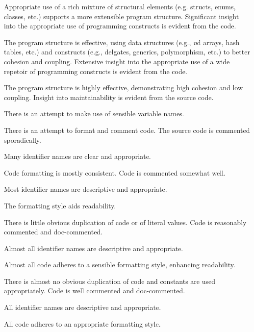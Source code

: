 \documentclass{../../fal_assignment}
\begin{document}
\begin{markingrubric}
            \par Appropriate use of a rich mixture of structural elements (e.g. structs, enums, classes, etc.) supports a more extensible program structure.
        \grade Significant insight into the appropriate use of programming constructs is evident from the code.
            \par The program structure is effective, using data structures (e.g., \textit{n}d arrays, hash tables, etc.) and constructs (e.g., delgates, generics, polymorphism, etc.) to better cohesion and coupling.
        \grade Extensive insight into the appropriate use of a wide repetoir of programming constructs is evident from the code.
            \par The program structure is highly effective, demonstrating high cohesion and low coupling.
%
        \grade\fail Insight into maintainability is evident from the source code.
            \par There is an attempt to make use of sensible variable names.
            \par There is an attempt to format and comment code.
        \grade The source code is commented sporadically.
            \par Many identifier names are clear and appropriate.
            \par Code formatting is mostly consistent.
        \grade Code is commented somewhat well.
            \par Most identifier names are descriptive and appropriate.
            \par The formatting style aids readability.
             \par There is little obvious duplication of code or of literal values.           
        \grade Code is reasonably commented and doc-commented.
            \par Almost all identifier names are descriptive and appropriate.
            \par Almost all code adheres to a sensible formatting style, enhancing readability.
             \par There is almost no obvious duplication of code and constants are used appropriately.   
        \grade Code is well commented and doc-commented.
            \par All identifier names are descriptive and appropriate.
            \par All code adheres to an appropriate formatting style.

\end{markingrubric}
\end{document}

